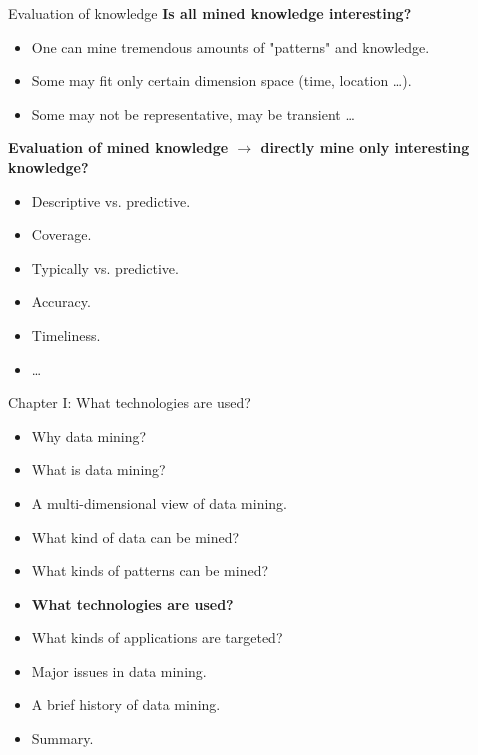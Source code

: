 \documentclass[aspectratio=169,t]{beamer}
\begin{document}
  {
    \begin{frame}{Evaluation of knowledge}
    \textbf{Is all mined knowledge interesting?}
    \begin{itemize}
        \item One can mine tremendous amounts of "patterns" and knowledge.
        \item Some may fit only certain dimension space (time, location \ldots).
        \item Some may not be representative, may be transient \ldots
    \end{itemize}

    \textbf{Evaluation of mined knowledge $\rightarrow$ directly mine only interesting knowledge?}
    \begin{itemize}
        \item Descriptive vs. predictive.
        \item Coverage.
        \item Typically vs. predictive.
        \item Accuracy.
        \item Timeliness.
        \item \ldots
    \end{itemize}
    \end{frame}
  }

  { 
    \begin{frame}{Chapter I: What technologies are used?}
        \begin{itemize}
            \item Why data mining?
            \item What is data mining?
            \item A multi-dimensional view of data mining.
            \item What kind of data can be mined?
            \item What kinds of patterns can be mined?
            \item \textbf{What technologies are used?}
            \item What kinds of applications are targeted?
            \item Major issues in data mining.
            \item A brief history of data mining.
            \item Summary.
        \end{itemize}
    \end{frame}
  }
\end{document}
